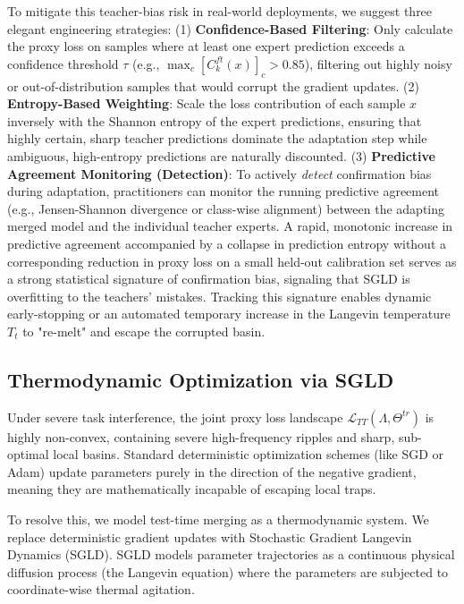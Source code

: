 To mitigate this teacher-bias risk in real-world deployments, we suggest three elegant engineering strategies: (1) \textbf{Confidence-Based Filtering}: Only calculate the proxy loss on samples where at least one expert prediction exceeds a confidence threshold $\tau$ (e.g., $\max_c [C_k^{ft}(x)]_c > 0.85$), filtering out highly noisy or out-of-distribution samples that would corrupt the gradient updates. (2) \textbf{Entropy-Based Weighting}: Scale the loss contribution of each sample $x$ inversely with the Shannon entropy of the expert predictions, ensuring that highly certain, sharp teacher predictions dominate the adaptation step while ambiguous, high-entropy predictions are naturally discounted. (3) \textbf{Predictive Agreement Monitoring (Detection)}: To actively \emph{detect} confirmation bias during adaptation, practitioners can monitor the running predictive agreement (e.g., Jensen-Shannon divergence or class-wise alignment) between the adapting merged model and the individual teacher experts.
A rapid, monotonic increase in predictive agreement accompanied by a collapse in prediction entropy without a corresponding reduction in proxy loss on a small held-out calibration set serves as a strong statistical signature of confirmation bias, signaling that SGLD is overfitting to the teachers' mistakes.
Tracking this signature enables dynamic early-stopping or an automated temporary increase in the Langevin temperature $T_t$ to "re-melt" and escape the corrupted basin.

\subsection{Thermodynamic Optimization via SGLD}
Under severe task interference, the joint proxy loss landscape $\mathcal{L}_{TT}(\Lambda, \Theta^{tr})$ is highly non-convex, containing severe high-frequency ripples and sharp, sub-optimal local basins.
Standard deterministic optimization schemes (like SGD or Adam) update parameters purely in the direction of the negative gradient, meaning they are mathematically incapable of escaping local traps.

To resolve this, we model test-time merging as a thermodynamic system.
We replace deterministic gradient updates with Stochastic Gradient Langevin Dynamics (SGLD).
SGLD models parameter trajectories as a continuous physical diffusion process (the Langevin equation) where the parameters are subjected to coordinate-wise thermal agitation.

